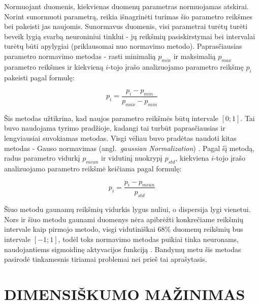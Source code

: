 \documentclass{VUMIFPSbakalaurinis}
\begin{document}
Normuojant duomenis, kiekvienas duomenų parametras normuojamas atskirai.
Norint sunormuoti parametrą, reikia išnagrinėti turimas šio parametro reikšmes bei pakeisti jas naujomis.
Sunormavus duomenis, visi parametrai turėtų turėti beveik lygią svarbą neuroniniui tinklui - jų reikšmių pasiskirstymai bei intervalai turėtų būti apylygiai (priklausomai nuo normavimo metodo).
Paprasčiausias parametro normavimo metodas - rasti minimalią $p_{min}$ ir maksimalią $p_{max}$ parametro reikšmes ir kiekvieną $i$-tojo įrašo analizuojamo parametro reikšmę $p_i$ pakeisti pagal formulę:

\begin{equation}
p_i = \frac{p_i - p_{min}}{p_{max} - p_{min}}
\end{equation}

Šis metodas užtikrina, kad naujos parametro reikšmės būtų intervale $[0; 1]$.
Tai buvo naudojama tyrimo pradžioje, kadangi tai turbūt paprasčiausias ir lengviausiai suvokiamas metodas.
Visgi vėliau buvo pradėtas naudoti kitas metodas - Gauso normavimas (angl.~\textit{gaussian Normalization}) \cite[817~psl.]{gaussian}.
Pagal šį metodą, radus parametro vidurkį $p_{mean}$ ir vidutinį nuokrypį $p_{std}$, kiekviena $i$-tojo įrašo analizuojamo parametro reikšmė keičiama pagal formulę:

\begin{equation}
p_i = \frac{p_i - p_{mean}}{p_{std}}
\end{equation}

Šiuo metodu gaunamų reikšmių vidurkis lygus nuliui, o dispersija lygi vienetui.
Nors ir šiuo metodu gaunami duomenys nėra apibrėžti konkrečiame reikšmių intervale kaip pirmojo metodo, visgi vidutiniškai 68\% duomenų reikšmių bus intervale $[-1; 1]$, todėl toks normavimo metodas puikiai tinka neuronams, naudojantiems sigmoidinę aktyvacijos funkciją \cite[817~psl.]{gaussian}.
Bandymų metu šis metodas pasirodė tinkamesnis tiriamai problemai nei prieš tai aprašytasis.



\clearpage
\section{DIMENSIŠKUMO MAŽINIMAS}
\end{document}
